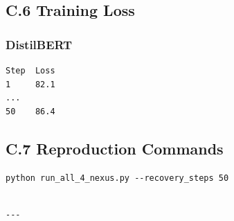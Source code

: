 \subsection{C.6 Training Loss}

\subsubsection{DistilBERT}
\begin{lstlisting}
Step  Loss
1     82.1
...
50    86.4
\end{lstlisting}

\subsection{C.7 Reproduction Commands}

\begin{lstlisting}
python run_all_4_nexus.py --recovery_steps 50
\end{lstlisting}
\begin{lstlisting}

---
\end{lstlisting}